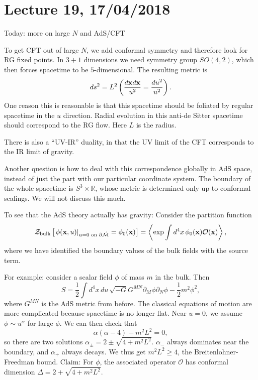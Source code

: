 \section*{Lecture 19, 17/04/2018}
Today: more on large $N$ and AdS/CFT

To get CFT out of large $N$, we add conformal symmetry and therefore look for RG fixed points.
In $3+1$ dimensions we need symmetry group $SO(4,2)$, which then forces spacetime to be $5$-dimensional.
The resulting metric is 
\[
ds^2 = L^2 \left( \frac{d \mathbf{x} d \mathbf{x}}{u^2} = \frac{du^2}{u^2}\right).
\]
One reason this is reasonable is that this spacetime should be foliated by regular spacetime in the $u$ direction.
Radial evolution in this anti-de Sitter spacetime should correspond to the RG flow.
Here $L$ is the radius.

There is also a ``UV-IR'' duality, in that the UV limit of the CFT corresponds to the IR limit of gravity.

Another question is how to deal with this correspondence globally in AdS space, instead of just the part with our particular coordinate system.
The boundary of the whole spacetime is $S^3 \times \mathbb{R}$, whose metric is determined only up to conformal scalings.
We will not discuss this much.

To see that the AdS theory actually has gravity:
Consider the partition function
\[
 \mathcal Z_{\text{bulk}} \left [\left . \phi(\mathbf{x}, u) \right |_{u = 0 \text{ on } \partial \hat{\mathcal M}} = \phi_0 (\mathbf{x}) \right ] = \left \langle \exp \int d^4x\, \phi_0(\mathbf{x}) \mathcal O(\mathbf{x}) \right \rangle,
\]
where we have identified the boundary values of the bulk fields with the source term.

For example: consider a scalar field $\phi$ of mass $m$ in the bulk.
Then
\[
S = \frac{1}{2} \int d^4x \, du \, \sqrt{-G} G^{MN} \partial_M \phi \partial_N \phi - \frac{1}{2} m^2 \phi^2,
\]
where $G^{MN}$ is the AdS metric from before.
The classical equations of motion are more complicated because spacetime is no longer flat.
Near $u = 0$, we assume $\phi \sim u^\alpha$ for large $\phi$.
We can then check that
\[
\alpha (\alpha -4) - m^2 L^2 = 0,
\]
so there are two solutions $\alpha_\pm = 2 \pm \sqrt{4 + m^2 L^2}$.
$\alpha_-$ always dominates near the boundary, and $\alpha_+$ always decays.
We thus get $m^2 L^2 \ge 4$, the Breitenlohner-Freedman bound.
Claim: For $\phi$, the associated operator $\mathcal O$ has conformal dimension $\Delta = 2 + \sqrt{4 + m^2 L^2}$.

